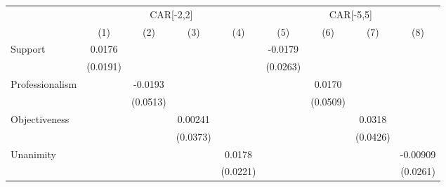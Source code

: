 {
\def\sym#1{\ifmmode^{#1}\else\(^{#1}\)\fi}
\begin{tabular}{l*{8}{c}}
\toprule
                    &\multicolumn{4}{c}{CAR[-2,2]}                                                          &\multicolumn{4}{c}{CAR[-5,5]}                                                          \\\cmidrule(lr){2-5}\cmidrule(lr){6-9}
                    &\multicolumn{1}{c}{(1)}         &\multicolumn{1}{c}{(2)}         &\multicolumn{1}{c}{(3)}         &\multicolumn{1}{c}{(4)}         &\multicolumn{1}{c}{(5)}         &\multicolumn{1}{c}{(6)}         &\multicolumn{1}{c}{(7)}         &\multicolumn{1}{c}{(8)}         \\
\midrule
Support             &      0.0176         &                     &                     &                     &     -0.0179         &                     &                     &                     \\
                    &    (0.0191)         &                     &                     &                     &    (0.0263)         &                     &                     &                     \\
Professionalism     &                     &     -0.0193         &                     &                     &                     &      0.0170         &                     &                     \\
                    &                     &    (0.0513)         &                     &                     &                     &    (0.0509)         &                     &                     \\
Objectiveness       &                     &                     &     0.00241         &                     &                     &                     &      0.0318         &                     \\
                    &                     &                     &    (0.0373)         &                     &                     &                     &    (0.0426)         &                     \\
Unanimity           &                     &                     &                     &      0.0178         &                     &                     &                     &    -0.00909         \\
                    &                     &                     &                     &    (0.0221)         &                     &                     &                     &    (0.0261)         \\

\end{tabular}}
